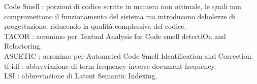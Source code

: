 Code Smell : porzioni di codice scritte in maniera non ottimale, le quali non compromettono il funzionamento del sistema ma introducono debolezze di progettazione, riducendo la qualità complessiva del codice. \\
TACOR : acronimo per Textual Analysis for Code smell detectiOn and Refactoring. \\
ASCETIC : acronimo per Automated Code Smell Identification and Correction. \\
tf-idf : abbreviazione di term frequency inverse document frequency. \\
LSI : abbreviazione di Latent Semantic Indexing. \\

